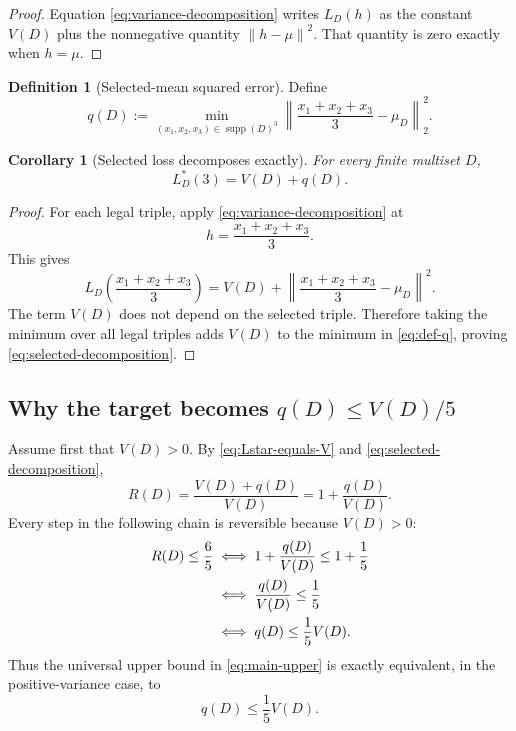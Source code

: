 \documentclass[11pt]{article}
\newtheorem{corollary}[theorem]{Corollary}
\theoremstyle{definition}
\newtheorem{definition}[theorem]{Definition}
\theoremstyle{remark}
\newcommand{\supp}{\operatorname{supp}}
\newcommand{\norm}[1]{\left\lVert #1\right\rVert}
\begin{document}
\begin{proof}
Equation \eqref{eq:variance-decomposition} writes $L_D(h)$ as the constant $V(D)$ plus the nonnegative quantity $\norm{h-\mu}^2$.  That quantity is zero exactly when $h=\mu$.
\end{proof}

\begin{definition}[Selected-mean squared error]
Define
\begin{equation}
q(D):=
\min_{(x_1,x_2,x_3)\in\supp(D)^3}
\norm{\frac{x_1+x_2+x_3}{3}-\mu_D}_2^2.
\label{eq:def-q}
\end{equation}
\end{definition}

\begin{corollary}[Selected loss decomposes exactly]
For every finite multiset $D$,
\begin{equation}
L_D^*(3)=V(D)+q(D).
\label{eq:selected-decomposition}
\end{equation}
\end{corollary}

\begin{proof}
For each legal triple, apply \eqref{eq:variance-decomposition} at
\[
h=\frac{x_1+x_2+x_3}{3}.
\]
This gives
\[
L_D\!\left(\frac{x_1+x_2+x_3}{3}\right)
=V(D)+
\norm{\frac{x_1+x_2+x_3}{3}-\mu_D}^2.
\]
The term $V(D)$ does not depend on the selected triple.  Therefore taking the minimum over all legal triples adds $V(D)$ to the minimum in \eqref{eq:def-q}, proving \eqref{eq:selected-decomposition}.
\end{proof}

\subsection{Why the target becomes \texorpdfstring{$q(D)\le V(D)/5$}{q(D) <= V(D)/5}}

Assume first that $V(D)>0$.  By \eqref{eq:Lstar-equals-V} and \eqref{eq:selected-decomposition},
\begin{equation}
R(D)=\frac{V(D)+q(D)}{V(D)}
=1+\frac{q(D)}{V(D)}.
\label{eq:ratio-q}
\end{equation}
Every step in the following chain is reversible because $V(D)>0$:
\begin{align}
R(D)\le\frac65
&\iff 1+\frac{q(D)}{V(D)}\le 1+\frac15 \notag\\
&\iff \frac{q(D)}{V(D)}\le\frac15 \notag\\
&\iff q(D)\le\frac15V(D).
\label{eq:exact-target-equivalence}
\end{align}
Thus the universal upper bound in \eqref{eq:main-upper} is exactly equivalent, in the positive-variance case, to
\begin{equation}
q(D)\le\frac15V(D).
\label{eq:target-q}
\end{equation}
\end{document}
